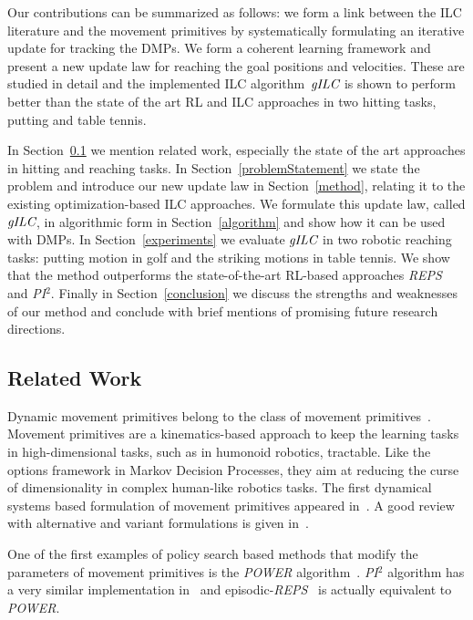 Our contributions can be summarized as follows: we form a link between the ILC literature and the movement primitives by systematically formulating an iterative update for tracking the DMPs. We form a coherent learning framework and present a new update law for reaching the goal positions and velocities. These are studied in detail and the implemented ILC algorithm~$\emph{gILC}$ is shown to perform better than the state of the art RL and ILC approaches in two hitting tasks, putting and table tennis.

In Section~\ref{relatedWork} we mention related work, especially the state of the art approaches in hitting and reaching tasks. In Section~\ref{problemStatement} we state the problem and introduce our new update law in Section~\ref{method}, relating it to the existing optimization-based ILC approaches. We formulate this update law, called $\emph{gILC}$, in algorithmic form in Section~\ref{algorithm} and show how it can be used with DMPs. In Section~\ref{experiments} we evaluate $\emph{gILC}$ in two robotic reaching tasks: putting motion in golf and the striking motions in table tennis. We show that the method outperforms the state-of-the-art RL-based approaches \emph{REPS} and \emph{PI$^{2}$}. Finally in Section~\ref{conclusion} we discuss the strengths and weaknesses of our method and conclude with brief mentions of promising future research directions.

\subsection{Related Work}\label{relatedWork}

Dynamic movement primitives belong to the class of movement primitives~\cite{Flash85}. Movement primitives are a kinematics-based approach to keep the learning tasks in high-dimensional tasks, such as in humonoid robotics, tractable. Like the options framework in Markov Decision Processes, they aim at reducing the curse of dimensionality in complex human-like robotics tasks. The first dynamical systems based formulation of movement primitives appeared in~\cite{Ijspeert02}. A good review with alternative and variant formulations is given in~\cite{Ijspeert13}.

One of the first examples of policy search based methods that modify the parameters of movement primitives is the \emph{POWER} algorithm~\cite{Kober08}. \emph{PI$^{2}$} algorithm has a very similar implementation in~\cite{Theodorou10} and episodic-\emph{REPS}~\cite{Peter10} is actually equivalent to \emph{POWER}.

